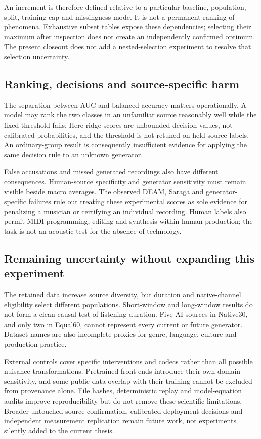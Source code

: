 An increment is therefore defined relative to a particular baseline,
population, split, training cap and missingness mode. It is not a permanent
ranking of phenomena. Exhaustive subset tables expose these dependencies;
selecting their maximum after inspection does not create an independently
confirmed optimum. The present closeout does not add a nested-selection
experiment to resolve that selection uncertainty.

\subsection{Ranking, decisions and source-specific harm}
The separation between AUC and balanced accuracy matters operationally.
A model may rank the two classes in an unfamiliar source reasonably well
while the fixed threshold fails. Here ridge scores are unbounded decision
values, not calibrated probabilities, and the threshold is not retuned on
held-source labels. An ordinary-group result is consequently insufficient
evidence for applying the same decision rule to an unknown generator.

False accusations and missed generated recordings also have different
consequences. Human-source specificity and generator sensitivity must remain
visible beside macro averages. The observed DEAM, Saraga and generator-specific
failures rule out treating these experimental scores as sole evidence for
penalizing a musician or certifying an individual recording. Human labels
also permit MIDI programming, editing and synthesis within human production;
the task is not an acoustic test for the absence of technology.

\subsection{Remaining uncertainty without expanding this experiment}
The retained data increase source diversity, but duration and native-channel
eligibility select different populations. Short-window and long-window
results do not form a clean causal test of listening duration. Five AI
sources in Native30, and only two in Equal60, cannot represent every current
or future generator. Dataset names are also incomplete proxies for genre,
language, culture and production practice.

External controls cover specific interventions and codecs rather than all
possible nuisance transformations. Pretrained front ends introduce their
own domain sensitivity, and some public-data overlap with their training
cannot be excluded from provenance alone. File hashes, deterministic replay
and model-equation audits improve reproducibility but do not remove these
scientific limitations. Broader untouched-source confirmation, calibrated
deployment decisions and independent measurement replication remain future
work, not experiments silently added to the current thesis.
